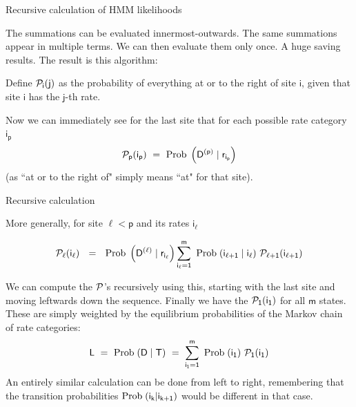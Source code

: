 \documentclass[bluish,slideColor,colorBG,pdf]{prosper}
\def\Prob{{\rm Prob\;}}
\def\prob{{\rm \;Prob\;}}
\begin{document}
\begin{slide}[Replace]{Recursive calculation of HMM likelihoods}
\bigskip

The summations can be evaluated innermost-outwards.  The same
summations appear in multiple terms.  We can then evaluate them
only once.  A huge saving results.  The result is this algorithm:

Define $\mathsf{{\cal P}_i(j)}$ as the probability of everything
at or to the right of site $\mathsf{i}$, given that site $\mathsf{i}$ has the
$\mathsf{j}$-th rate.

Now we can immediately see for the last site that for each possible
rate category $\mathsf{i_p}$
\[
\mathsf{{\cal P}_p(i_p)\ = \ \Prob\left(D^{(p)}\;|\;r_{i_p}\right)}
\]
(as ``at or to the right of" simply means ``at" for that site).

\end{slide}

\begin{slide}[Replace]{Recursive calculation}
\bigskip

More generally, for site $\mathsf{\ell < p}$ and its rates $\mathsf{i_\ell}$

\[
\mathsf{{\cal P}_\ell(i_\ell)\ \ = \ \ \Prob\left(D^{(\ell)}\;|\;r_{i_\ell}\right)
 \sum\limits_{i_\ell = 1}^m \ \Prob(i_{\ell+1}\;|\;i_\ell)\ {\cal P}_{\ell+1}(i_{\ell+1})}
\]

We can compute the $\mathsf{{\cal P}}$'s recursively using this,
starting with the last site and moving leftwards down the
sequence.  Finally we have the $\mathsf{{\cal P}_1(i_1)}$ for all $\mathsf{m}$
states.  These are simply weighted by the equilibrium
probabilities of the Markov chain of rate categories:
\[
\mathsf{L\ =\ \Prob(D\;|\;T)\ = \ \sum\limits_{i_1=1}^m\ \Prob(i_1)\ {\cal P}_1(i_1)}
\]
An entirely similar calculation can be done from left to right,
remembering that the transition probabilities $\mathsf{\Prob(i_k|i_{k+1})}$ would
be different in that case.

\end{slide}

% 
% 
% 
% 
\end{document}
